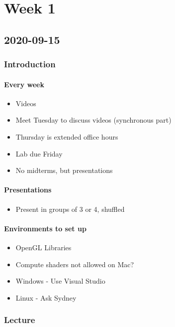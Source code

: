 \chapter{Week 1}

\section{2020-09-15}

\subsection{Introduction}

\subsubsection{Every week}

\begin{itemize}
    \item Videos
    \item Meet Tuesday to discuss videos (synchronous part)
    \item Thursday is extended office hours
    \item Lab due Friday
    \item No midterms, but presentations
\end{itemize}

\subsubsection{Presentations}

\begin{itemize}
    \item Present in groups of 3 or 4, shuffled
\end{itemize}

\subsubsection{Environments to set up}

\begin{itemize}
    \item OpenGL Libraries
    \item Compute shaders not allowed on Mac?
    \item Windows - Use Visual Studio
    \item Linux - Ask Sydney
\end{itemize}

\subsection{Lecture}

